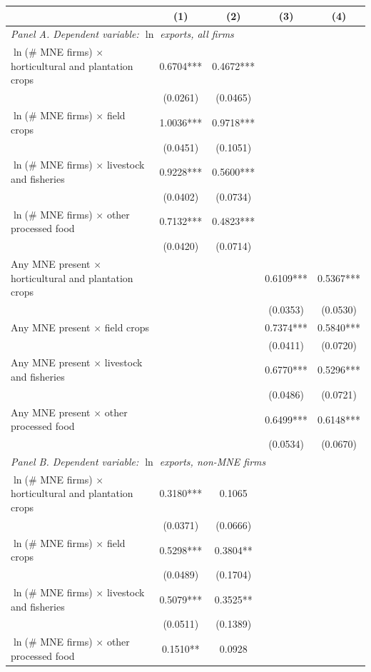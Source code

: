 \begin{tabular}{lcccc} \hline
 & (1) & (2) & (3) & (4) \\ \hline
\multicolumn{5}{l}{\textit{Panel A. Dependent variable: $\ln$ exports, all firms}} \\
$\ln$(\# MNE firms) $\times$ horticultural and plantation crops & 0.6704*** & 0.4672*** &  &  \\
 & (0.0261) & (0.0465) &  &  \\
$\ln$(\# MNE firms) $\times$ field crops & 1.0036*** & 0.9718*** &  &  \\
 & (0.0451) & (0.1051) &  &  \\
$\ln$(\# MNE firms) $\times$ livestock and fisheries & 0.9228*** & 0.5600*** &  &  \\
 & (0.0402) & (0.0734) &  &  \\
$\ln$(\# MNE firms) $\times$ other processed food & 0.7132*** & 0.4823*** &  &  \\
 & (0.0420) & (0.0714) &  &  \\
Any MNE present $\times$ horticultural and plantation crops &  &  & 0.6109*** & 0.5367*** \\
 &  &  & (0.0353) & (0.0530) \\
Any MNE present $\times$ field crops &  &  & 0.7374*** & 0.5840*** \\
 &  &  & (0.0411) & (0.0720) \\
Any MNE present $\times$ livestock and fisheries &  &  & 0.6770*** & 0.5296*** \\
 &  &  & (0.0486) & (0.0721) \\
Any MNE present $\times$ other processed food &  &  & 0.6499*** & 0.6148*** \\
 &  &  & (0.0534) & (0.0670) \\
\midrule
\multicolumn{5}{l}{\textit{Panel B. Dependent variable: $\ln$ exports, non-MNE firms}} \\
$\ln$(\# MNE firms) $\times$ horticultural and plantation crops & 0.3180*** & 0.1065 &  &  \\
 & (0.0371) & (0.0666) &  &  \\
$\ln$(\# MNE firms) $\times$ field crops & 0.5298*** & 0.3804** &  &  \\
 & (0.0489) & (0.1704) &  &  \\
$\ln$(\# MNE firms) $\times$ livestock and fisheries & 0.5079*** & 0.3525** &  &  \\
 & (0.0511) & (0.1389) &  &  \\
$\ln$(\# MNE firms) $\times$ other processed food & 0.1510** & 0.0928 &  &  \\

\end{tabular}
